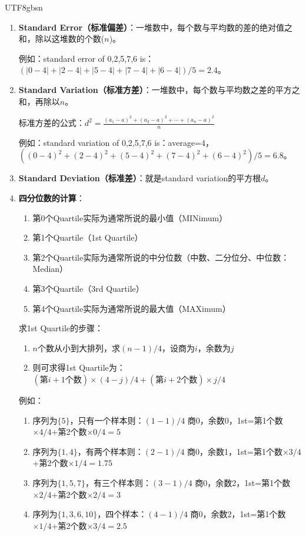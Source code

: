 \documentclass[12pt]{article}
\begin{document}
\begin{CJK*}{UTF8}{gbsn}
\begin{enumerate}
    \item \textbf{Standard Error（标准偏差）}：一堆数中，每个数与平均数的差的绝对值之和，除以这堆数的个数($n$)。
    
    例如：standard error of 0,2,5,7,6 is：$(|0-4|+|2-4|+|5-4|+|7-4|+|6-4|)/5=2.4$。
    
    \item \textbf{Standard Variation（标准方差）}：一堆数中，每个数与平均数之差的平方之和，再除以$n$。
    
    标准方差的公式：$d^2 = \frac{(a_1-a)^2+(a_2-a)^2+\cdots+(a_n-a)^2}{n}$
    
    例如：standard variation of 0,2,5,7,6 is：average=4，$((0-4)^2+(2-4)^2+(5-4)^2+(7-4)^2+(6-4)^2)/5=6.8$。
    
    \item \textbf{Standard Deviation（标准差）}：就是standard variation的平方根$d$。
    
    \item \textbf{四分位数的计算}：
    \begin{enumerate}
        \item 第0个Quartile实际为通常所说的最小值（MINimum）
        \item 第1个Quartile（1st Quartile）
        \item 第2个Quartile实际为通常所说的中分位数（中数、二分位分、中位数：Median）
        \item 第3个Quartile（3rd Quartile）
        \item 第4个Quartile实际为通常所说的最大值（MAXimum）
    \end{enumerate}
    
    求1st Quartile的步骤：
    \begin{enumerate}
        \item $n$个数从小到大排列，求$(n-1)/4$，设商为$i$，余数为$j$
        \item 则可求得1st Quartile为：$(第i+1个数) \times (4-j)/4 + (第i+2个数) \times j/4$
    \end{enumerate}
    
    例如：
    \begin{enumerate}
        \item 序列为$\{5\}$，只有一个样本则：$(1-1)/4$ 商0，余数0，1st=第1个数$\times 4/4$+第2个数$\times 0/4=5$
        \item 序列为$\{1,4\}$，有两个样本则：$(2-1)/4$ 商0，余数1，1st=第1个数$\times 3/4$+第2个数$\times 1/4=1.75$
        \item 序列为$\{1,5,7\}$，有三个样本则：$(3-1)/4$ 商0，余数2，1st=第1个数$\times 2/4$+第2个数$\times 2/4=3$
        \item 序列为$\{1,3,6,10\}$，四个样本：$(4-1)/4$ 商0，余数2，1st=第1个数$\times 1/4$+第2个数$\times 3/4=2.5$
    \end{enumerate}
    

\end{enumerate}
\end{CJK*}
\end{document}
